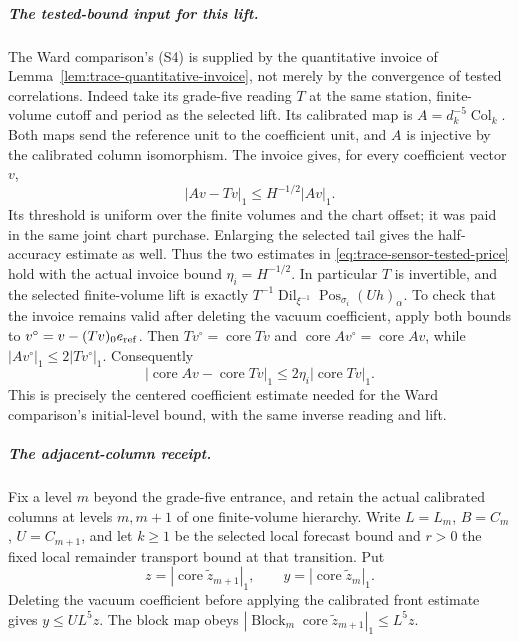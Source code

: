 \subparagraph{The tested-bound input for this lift.}
The Ward comparison's (S4) is supplied by the quantitative invoice of
Lemma~\ref{lem:trace-quantitative-invoice}, not merely by the convergence
of tested correlations. Indeed take its grade-five reading $T$ at the
same station, finite-volume cutoff and period as the selected lift.
Its calibrated map is $A=d_k^{-5}\operatorname{Col}_k$. Both maps send
the reference unit to the coefficient unit, and $A$ is injective by the
calibrated column isomorphism. The invoice gives, for every coefficient
vector $v$,
\[
 |Av-Tv|_1\le H^{-1/2}|Av|_1.
\]
Its threshold is uniform over the finite volumes and the chart offset;
it was paid in the same joint chart purchase. Enlarging the selected
tail gives the half-accuracy estimate as well. Thus the two estimates
in \eqref{eq:trace-sensor-tested-price} hold with the actual invoice bound
$\eta_i=H^{-1/2}$. In particular $T$ is invertible, and the selected
finite-volume lift is exactly
$T^{-1}\operatorname{Dil}_{\xi^{-1}}
 \operatorname{Pos}_{\sigma_i}(Uh)_\alpha$.
To check that the invoice remains valid after deleting the vacuum
coefficient, apply both bounds to
$v^\circ=v-(Tv)_0e_{\rm ref}$. Then
$Tv^\circ=\operatorname{core}Tv$ and
$\operatorname{core}Av^\circ=\operatorname{core}Av$, while
$|Av^\circ|_1\le2|Tv^\circ|_1$. Consequently
\[
 |\operatorname{core}Av-\operatorname{core}Tv|_1
 \le2\eta_i|\operatorname{core}Tv|_1.
\]
This is precisely the centered coefficient estimate needed for the
Ward comparison's initial-level bound, with the same inverse reading and lift.

\subparagraph{The adjacent-column receipt.}
Fix a level $m$ beyond the grade-five entrance, and retain the actual
calibrated columns at levels $m,m+1$ of one finite-volume hierarchy.
Write $L=L_m$, $B=C_m$, $U=C_{m+1}$, and let $k\ge1$ be the selected
local forecast bound and $r>0$ the fixed local remainder transport
bound at that transition. Put
\[
 z=|\operatorname{core}\widetilde z_{m+1}|_1,
 \qquad y=|\operatorname{core}\widetilde z_m|_1.
\]
Deleting the vacuum coefficient before applying the calibrated front
estimate gives $y\le UL^5z$. The block map obeys
$|\operatorname{Block}_m\operatorname{core}
\widetilde z_{m+1}|_1\le L^5z$.

